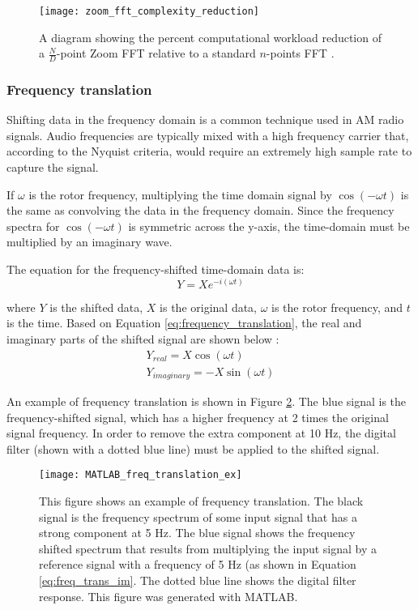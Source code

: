 \begin{figure}
	\centering
	\texttt{[image: zoom\_fft\_complexity\_reduction]}
	\decoRule
	\caption{A diagram showing the percent computational workload reduction of a $\frac{N}{D}$-point Zoom FFT relative to a standard $n$-points FFT \cite{embedded_zoom_fft}.}
	\label{fig:zoom_fft_complexity_reduction}
\end{figure}



\subsubsection{Frequency translation}
Shifting data in the frequency domain is a common technique used in AM radio signals.  Audio frequencies are typically mixed with a high frequency carrier that, according to the Nyquist criteria, would require an extremely high sample rate to capture the signal.

If $\omega$ is the rotor frequency, multiplying the time domain signal by $\cos{(-\omega t)}$ is the same as convolving the data in the frequency domain.  Since the frequency spectra for $\cos{(-\omega t)}$ is symmetric across the y-axis, the time-domain must be multiplied by an imaginary wave.

The equation for the frequency-shifted time-domain data is:
\begin{equation} \label{eq:frequency_translation}
	Y = X e^{-i (\omega t)}
\end{equation}

where $Y$ is the shifted data, $X$ is the original data, $\omega$ is the rotor frequency, and $t$ is the time.  Based on Equation \ref{eq:frequency_translation}, the real and imaginary parts of the shifted signal are shown below \cite{zoom_fft_ref}:
\begin{align}
	Y_{real} = X \cos{(\omega t)} \\
	Y_{imaginary} = -X \sin{(\omega t)} \label{eq:freq_trans_im}
\end{align}

An example of frequency translation is shown in Figure \ref{fig:MATLAB_freq_translation_ex}.  The blue signal is the frequency-shifted signal, which has a higher frequency at 2 times the original signal frequency.  In order to remove the extra component at 10 Hz, the digital filter (shown with a dotted blue line) must be applied to the shifted signal.

\begin{figure}
	\centering
	\texttt{[image: MATLAB\_freq\_translation\_ex]}
	\decoRule
	\caption{This figure shows an example of frequency translation.  The black signal is the frequency spectrum of some input signal that has a strong component at 5 Hz.  The blue signal shows the frequency shifted spectrum that results from multiplying the input signal by a reference signal with a frequency of 5 Hz (as shown in Equation \ref{eq:freq_trans_im}.  The dotted blue line shows the digital filter response.  This figure was generated with MATLAB.}
	\label{fig:MATLAB_freq_translation_ex}
\end{figure}

